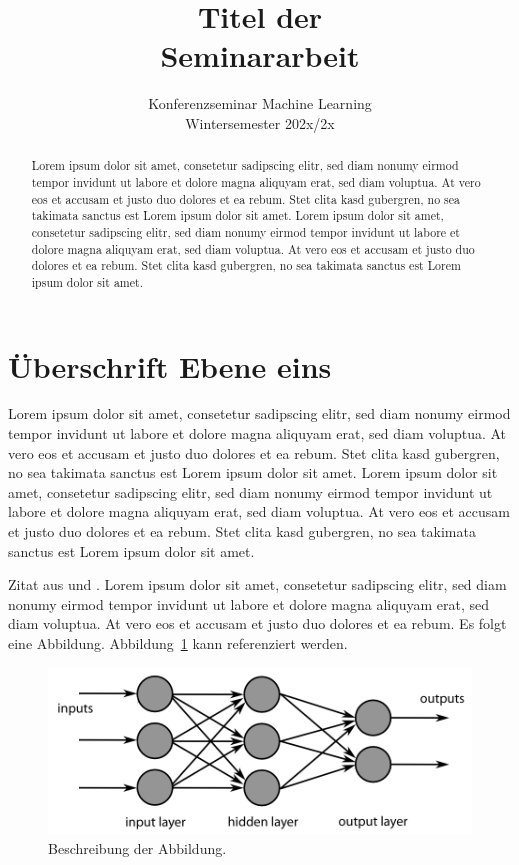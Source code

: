 \documentclass[a4paper, twoside]{IEEEtran}
\title{{{Titel der \\ Seminararbeit}}}
\author{
  \IEEEauthorblockN{{{Max Mustermann}}\\}
  \IEEEauthorblockA{Fachhochschule Südwestfalen}
  
  \vspace{3mm}
  Konferenzseminar Machine Learning\\
  Wintersemester 202x/2x
}
\begin{document}
\maketitle

\begin{abstract}
Lorem ipsum dolor sit amet, consetetur sadipscing elitr, sed diam nonumy eirmod tempor invidunt ut labore et dolore magna aliquyam erat, sed diam voluptua. At vero eos et accusam et justo duo dolores et ea rebum. Stet clita kasd gubergren, no sea takimata sanctus est Lorem ipsum dolor sit amet. Lorem ipsum dolor sit amet, consetetur sadipscing elitr, sed diam nonumy eirmod tempor invidunt ut labore et dolore magna aliquyam erat, sed diam voluptua. At vero eos et accusam et justo duo dolores et ea rebum. Stet clita kasd gubergren, no sea takimata sanctus est Lorem ipsum dolor sit amet.
\end{abstract}

\section{Überschrift Ebene eins}

Lorem ipsum dolor sit amet, consetetur sadipscing elitr, sed diam nonumy eirmod tempor invidunt ut labore et dolore magna aliquyam erat, sed diam voluptua. At vero eos et accusam et justo duo dolores et ea rebum. Stet clita kasd gubergren, no sea takimata sanctus est Lorem ipsum dolor sit amet. Lorem ipsum dolor sit amet, consetetur sadipscing elitr, sed diam nonumy eirmod tempor invidunt ut labore et dolore magna aliquyam erat, sed diam voluptua. At vero eos et accusam et justo duo dolores et ea rebum. Stet clita kasd gubergren, no sea takimata sanctus est Lorem ipsum dolor sit amet.

Zitat aus \cite{scheme} und \cite[17]{knuth}. Lorem ipsum dolor sit amet, consetetur sadipscing elitr, sed diam nonumy eirmod tempor invidunt ut labore et dolore magna aliquyam erat, sed diam voluptua. At vero eos et accusam et justo duo dolores et ea rebum.
Es folgt eine Abbildung. Abbildung~\ref{abbildung1} kann referenziert werden.

\begin{figure}[htbp]
\centering
\includegraphics[width=\columnwidth]{deeplearning}
\caption{Beschreibung der Abbildung.}
\label{abbildung1}
\end{figure}
\end{document}
